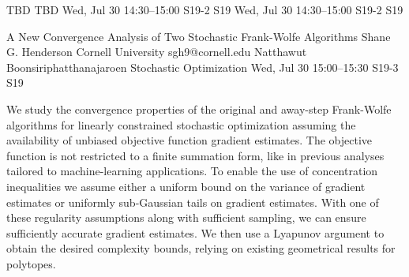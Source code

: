 \begin{talk}
  {TBD}%
  {TBD}%
  {Wed, Jul 30 14:30–15:00}%
  {S19-2}%
  {S19}%
  {}%
  {Wed, Jul 30 14:30–15:00}%
  {S19-2}%
  {S19}%
\end{talk}

\begin{talk}
  {A New Convergence Analysis of Two Stochastic Frank-Wolfe Algorithms}%
  {Shane G. Henderson}%
  {Cornell University}%
  {sgh9@cornell.edu}%
  {Natthawut Boonsiriphatthanajaroen}%
  {Stochastic Optimization}%
  {Wed, Jul 30 15:00–15:30}%
  {S19-3}%
  {S19}%
				
			
We study the convergence properties of the original and away-step
Frank-Wolfe algorithms for linearly constrained stochastic
optimization assuming the availability of unbiased objective function
gradient estimates. The objective function is not restricted to a
finite summation form, like in previous analyses tailored to
machine-learning applications. To enable the use of concentration
inequalities we assume either a uniform bound on the variance of
gradient estimates or uniformly sub-Gaussian tails on gradient
estimates. With one of these regularity assumptions along with
sufficient sampling, we can ensure sufficiently accurate gradient
estimates. We then use a Lyapunov argument to obtain the desired
complexity bounds, relying on existing geometrical results for
polytopes. 
\end{talk}

